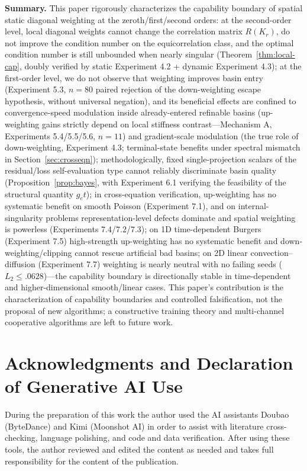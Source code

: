 \documentclass[11pt]{article}
\numberwithin{equation}{section}
\begin{document}
\noindent\textbf{Summary.} This paper rigorously characterizes the capability boundary of spatial static diagonal weighting at the zeroth/first/second orders: at the second-order level, local diagonal weights cannot change the correlation matrix $R(K_r)$, do not improve the condition number on the equicorrelation class, and the optimal condition number is still unbounded when nearly singular (Theorem~\ref{thm:local-cap}, doubly verified by static Experiment 4.2 + dynamic Experiment 4.3); at the first-order level, we do not observe that weighting improves basin entry (Experiment 5.3, $n=80$ paired rejection of the down-weighting escape hypothesis, without universal negation), and its beneficial effects are confined to convergence-speed modulation inside already-entered refinable basins (up-weighting gains strictly depend on local stiffness contrast---Mechanism A, Experiments 5.4/5.5/5.6, $n=11$) and gradient-scale modulation (the true role of down-weighting, Experiment 4.3; terminal-state benefits under spectral mismatch in Section~\ref{sec:crosseqn}); methodologically, fixed single-projection scalars of the residual/loss self-evaluation type cannot reliably discriminate basin quality (Proposition~\ref{prop:bayes}, with Experiment 6.1 verifying the feasibility of the structural quantity $g_et$); in cross-equation verification, up-weighting has no systematic benefit on smooth Poisson (Experiment 7.1), and on internal-singularity problems representation-level defects dominate and spatial weighting is powerless (Experiments 7.4/7.2/7.3); on 1D time-dependent Burgers (Experiment 7.5) high-strength up-weighting has no systematic benefit and down-weighting/clipping cannot rescue artificial bad basins; on 2D linear convection--diffusion (Experiment 7.7) weighting is nearly neutral with no failing seeds ($L_2\le.0628$)---the capability boundary is directionally stable in time-dependent and higher-dimensional smooth/linear cases. This paper's contribution is the characterization of capability boundaries and controlled falsification, not the proposal of new algorithms; a constructive training theory and multi-channel cooperative algorithms are left to future work.

\FloatBarrier

\section*{Acknowledgments and Declaration of Generative AI Use}
During the preparation of this work the author used the AI assistants Doubao (ByteDance) and Kimi (Moonshot AI) in order to assist with literature cross-checking, language polishing, and code and data verification. After using these tools, the author reviewed and edited the content as needed and takes full responsibility for the content of the publication.
\end{document}
